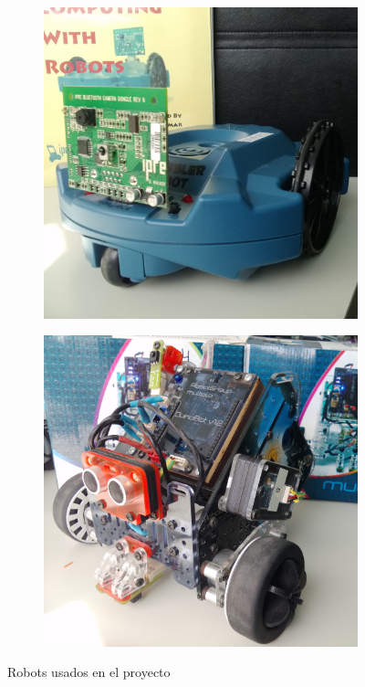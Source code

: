 \begin{figure}
    \centering
    \begin{subfigure}[b]{0.49\textwidth}
        \includegraphics[width=\textwidth]{figures/scribbler}
        \label{fig:robots_usados_scribbler}
    \end{subfigure}
    \begin{subfigure}[b]{0.49\textwidth}
        \includegraphics[width=\textwidth]{figures/n6}
        \label{fig:robots_usados_n6}
    \end{subfigure}
    \caption{Robots usados en el proyecto}\label{fig:robots_usados}
\end{figure}

